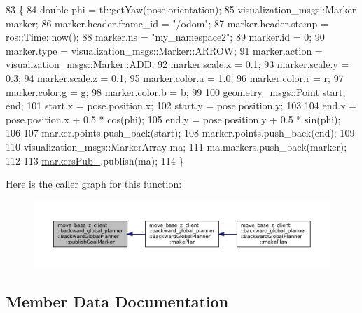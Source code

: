 \begin{DoxyCode}
83 \{
84     \textcolor{keywordtype}{double} phi = tf::getYaw(pose.orientation);
85     visualization\_msgs::Marker marker;
86     marker.header.frame\_id = \textcolor{stringliteral}{"/odom"};
87     marker.header.stamp = ros::Time::now();
88     marker.ns = \textcolor{stringliteral}{"my\_namespace2"};
89     marker.id = 0;
90     marker.type = visualization\_msgs::Marker::ARROW;
91     marker.action = visualization\_msgs::Marker::ADD;
92     marker.scale.x = 0.1;
93     marker.scale.y = 0.3;
94     marker.scale.z = 0.1;
95     marker.color.a = 1.0;
96     marker.color.r = r;
97     marker.color.g = g;
98     marker.color.b = b;
99 
100     geometry\_msgs::Point start, end;
101     start.x = pose.position.x;
102     start.y = pose.position.y;
103 
104     end.x = pose.position.x + 0.5 * cos(phi);
105     end.y = pose.position.y + 0.5 * sin(phi);
106 
107     marker.points.push\_back(start);
108     marker.points.push\_back(end);
109 
110     visualization\_msgs::MarkerArray ma;
111     ma.markers.push\_back(marker);
112 
113     \hyperlink{classmove__base__z__client_1_1backward__global__planner_1_1BackwardGlobalPlanner_a52a247da9267a83e51679d41e09f11a4}{markersPub\_}.publish(ma);
114 \}
\end{DoxyCode}
Here is the caller graph for this function\+:
\nopagebreak
\begin{figure}[H]
\begin{center}
\leavevmode
\includegraphics[width=350pt]{classmove__base__z__client_1_1backward__global__planner_1_1BackwardGlobalPlanner_adefb1127aa2a4f9c487763aea3817864_icgraph}
\end{center}
\end{figure}


\subsection{Member Data Documentation}
\mbox{\label{classmove__base__z__client_1_1backward__global__planner_1_1BackwardGlobalPlanner_a470ef57fa2c4caf288ef4ba2934f44e2}} 
